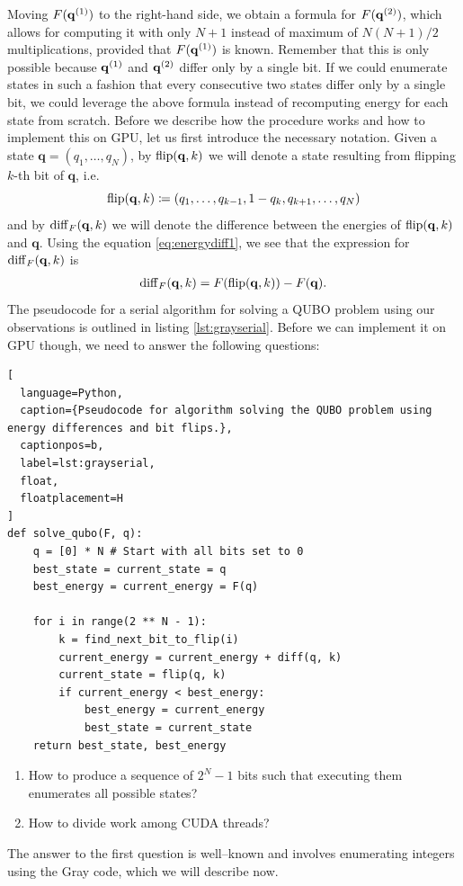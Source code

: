 Moving $F(\mathbf{q}^{(1)})$ to the right-hand side, we obtain a formula for $F(\mathbf{q}^{(2)})$,
which allows for computing it with only $N+1$ instead of maximum of $N(N+1)/2$
multiplications, provided that $F(\mathbf{q}^{(1)})$ is known. Remember that this is only
possible because $\mathbf{q}^{(1)}$ and $\mathbf{q}^{(2)}$ differ only by a single bit. If we could
enumerate states in such a fashion that every consecutive two states differ
only by a single bit, we could leverage the above formula instead of
recomputing energy for each state from scratch. Before we describe how the
procedure works and how to implement this on GPU, let us first introduce the
necessary notation. Given a state $\mathbf{q} = (q_{1},\ldots,q_{N})$, by
$\operatorname*{flip}(\mathbf{q},k)$ we will denote a state resulting from flipping $k$-th
bit of $\mathbf{q}$, i.e.
\begin{equation}
  \operatorname*{flip}(\mathbf{q},k) \coloneq (q_{1}, \ldots, q_{k-1}, 1-q_{k}, q_{k+1}, \ldots, q_{N})
\end{equation}
and by $\operatorname{diff}_{F}(\mathbf{q},k)$ we will denote the difference between the
energies of $\operatorname*{flip}(\mathbf{q},k)$ and $\mathbf{q}$. Using the equation
\eqref{eq:energydiff1}, we see that the expression for
$\operatorname{diff}_{F}(\mathbf{q},k)$ is
\begin{align}
  \begin{split}
    \operatorname{diff}_{F}(\mathbf{q},k) = F(\operatorname*{flip}(\mathbf{q},k)) - F(\mathbf{q}).
  \end{split}
\end{align}
The pseudocode for a serial algorithm for solving a QUBO problem using our
observations is outlined in listing \ref{lst:grayserial}. Before we can
implement it on GPU though, we need to answer the following questions:
\begin{lstlisting}[
  language=Python,
  caption={Pseudocode for algorithm solving the QUBO problem using energy differences and bit flips.},
  captionpos=b,
  label=lst:grayserial,
  float,
  floatplacement=H
]
def solve_qubo(F, q):
    q = [0] * N # Start with all bits set to 0
    best_state = current_state = q
    best_energy = current_energy = F(q)

    for i in range(2 ** N - 1):
        k = find_next_bit_to_flip(i)
        current_energy = current_energy + diff(q, k)
        current_state = flip(q, k)
        if current_energy < best_energy:
            best_energy = current_energy
            best_state = current_state
    return best_state, best_energy
\end{lstlisting}
\begin{enumerate}
  \item How to produce a sequence of $2^{N}-1$ bits such that executing them enumerates
        all possible states?
  \item How to divide work among CUDA threads?
\end{enumerate}
The answer to the first question is well--known and involves enumerating integers using
the Gray code, which we will describe now.

